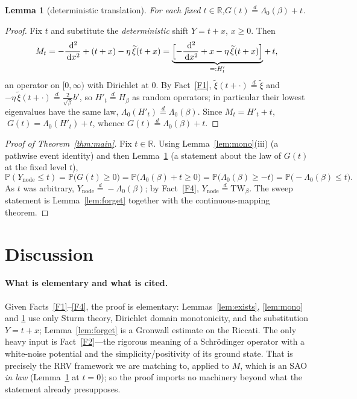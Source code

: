 \documentclass[11pt]{article}
\newtheorem{lemma}{Lemma}
\theoremstyle{definition}
\theoremstyle{remark}
\newcommand{\dd}{\,\mathrm{d}}
\newcommand{\Ynode}{Y_{\mathrm{node}}}
\newcommand{\TW}{\mathrm{TW}}
\newcommand{\R}{\mathbb{R}}
\newcommand{\eqd}{\stackrel{d}{=}}
\newcommand{\xit}{\widetilde{\xi}}
\begin{document}
\begin{lemma}[deterministic translation]\label{lem:translate}
For each fixed $t\in\R$,\quad $G(t)\eqd\Lambda_0(\beta)+t$.
\end{lemma}

\begin{proof}
Fix $t$ and substitute the \emph{deterministic} shift $Y=t+x$, $x\ge0$. Then
\[
  M_t=-\frac{\dd^2}{\dd x^2}+(t+x)-\eta\,\xit(t+x)
     =\underbrace{\Bigl[-\frac{\dd^2}{\dd x^2}+x-\eta\,\xit(t+x)\Bigr]}_{=:H'_t}+\,t ,
\]
an operator on $[0,\infty)$ with Dirichlet at $0$. By Fact~\ref{F1}, $\xit(t+\cdot)\eqd
\xit$ and $-\eta\,\xit(t+\cdot)\eqd\tfrac{2}{\sqrt\beta}b'$, so $H'_t\eqd H_\beta$ as
random operators; in particular their lowest eigenvalues have the same law,
$\Lambda_0(H'_t)\eqd\Lambda_0(\beta)$. Since $M_t=H'_t+t$, $\;G(t)=\Lambda_0(H'_t)+t$,
whence $G(t)\eqd\Lambda_0(\beta)+t$.
\end{proof}

\begin{proof}[Proof of Theorem~\ref{thm:main}]
Fix $t\in\R$. Using Lemma~\ref{lem:mono}(iii) (a pathwise event identity) and then
Lemma~\ref{lem:translate} (a statement about the law of $G(t)$ at the fixed level $t$),
\[
  \mathbb P(\Ynode\le t)
  =\mathbb P\bigl(G(t)\ge0\bigr)
  =\mathbb P\bigl(\Lambda_0(\beta)+t\ge0\bigr)
  =\mathbb P\bigl(\Lambda_0(\beta)\ge-t\bigr)
  =\mathbb P\bigl(-\Lambda_0(\beta)\le t\bigr).
\]
As $t$ was arbitrary, $\Ynode\eqd-\Lambda_0(\beta)$; by Fact~\ref{F4},
$\Ynode\eqd\TW_\beta$. The sweep statement is Lemma~\ref{lem:forget} together with the
continuous-mapping theorem.
\end{proof}

\section{Discussion}

\paragraph{What is elementary and what is cited.} Given Facts~\ref{F1}--\ref{F4}, the
proof is elementary: Lemmas~\ref{lem:exists}, \ref{lem:mono} and \ref{lem:translate} use
only Sturm theory, Dirichlet domain monotonicity, and the substitution $Y=t+x$;
Lemma~\ref{lem:forget} is a Gronwall estimate on the Riccati. The only heavy input is
Fact~\ref{F2}---the rigorous meaning of a Schr\"odinger operator with a white-noise
potential and the simplicity/positivity of its ground state. That is precisely the RRV
framework we are matching to, applied to $M$, which is an SAO \emph{in law}
(Lemma~\ref{lem:translate} at $t=0$); so the proof imports no machinery beyond what the
statement already presupposes.
\end{document}
